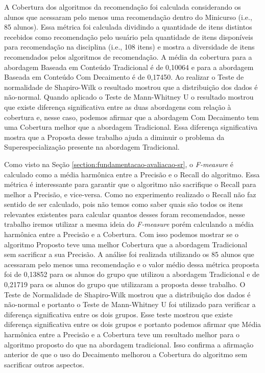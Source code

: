 A Cobertura dos algoritmos da recomendação foi calculada considerando os alunos que acessaram pelo menos uma recomendação
dentro do Minicurso (i.e., 85 alunos). Essa métrica foi calculada dividindo a quantidade de itens distintos recebidos
como recomendação pelo usuário pela quantidade de itens disponíveis para recomendação na disciplina (i.e., 108 itens) e mostra
a diversidade de itens recomendados pelos algoritmos de recomendação. A média da cobertura para a abordagem Baseada em Conteúdo
Tradicional é de 0,10064 e para a abordagem Baseada em Conteúdo Com Decaimento é de 0,17450. Ao realizar o Teste de
normalidade de Shapiro-Wilk o resultado mostrou que a distribuição dos dados é não-normal. Quando aplicado o Teste de Mann-Whitney
U o resultado mostrou que existe diferença significativa entre as duas abordagens com relação à cobertura e, nesse caso,
podemos afirmar que a abordagem Com Decaimento tem uma Cobertura melhor que a abordagem Tradicional. Essa diferença significativa
mostra que a Proposta desse trabalho ajuda a diminuir o problema da Superespecialização presente na abordagem Tradicional.

Como visto na Seção \ref{section:fundamentacao-avaliacao-sr}, o \textit{F-measure} é calculado como a média harmônica entre
a Precisão e o Recall do algoritmo. Essa métrica é interessante para garantir que o algoritmo não sacrifique o Recall
para melhor a Precisão, e vice-versa. Como no experimento realizado o Recall não faz sentido de ser calculado, pois não
temos como saber quais são todos os itens relevantes existentes para calcular quantos desses foram recomendados, nesse
trabalho iremos utilizar a mesma ideia do \textit{F-measure} porém calculando a média harmônica entre a Precisão e a Cobertura.
Com isso podemos mostrar se o algoritmo Proposto teve uma melhor Cobertura que a abordagem Tradicional sem sacrificar
a sua Precisão. A análise foi realizada utilizando os 85 alunos que acessaram pelo menos uma recomendação e o valor médio
dessa métrica proposta foi de 0,13852 para os alunos do grupo que utilizou a abordagem Tradicional e de 0,21719 para os alunos
do grupo que utilizaram a proposta desse trabalho. O Teste de Normalidade de Shapiro-Wilk mostrou que a distribuição dos
dados é não-normal e portanto o Teste de Mann-Whitney U foi utilizado para verificar a diferença significativa entre os dois
grupos. Esse teste mostrou que existe diferença significativa entre os dois grupos e portanto podemos afirmar que Média harmônica entre a
Precisão e a Cobertura teve um resultado melhor para o algoritmo proposto do que na abordagem tradicional. Isso confirma a
afirmação anterior de que o uso do Decaimento melhorou a Cobertura do algoritmo sem sacrificar outros aspectos.

